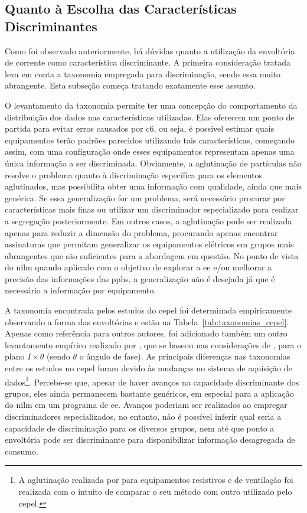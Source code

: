 \subsection{Quanto à Escolha das Características Discriminantes}
\label{ssec:caracteristicas}

Como foi observado anteriormente, há dúvidas quanto a utilização da
envoltória de corrente como característica discriminante. A primeira
consideração tratada leva em conta a taxonomia empregada para
discriminação, sendo essa muito abrangente. Esta subseção começa
tratando exatamente esse assunto.

O levantamento da taxonomia permite ter uma concepção do comportamento
da distribuição dos dados nas características utilizadas. Elas
oferecem um ponto de partida para evitar erros causados por \gls{c6},
ou seja, é possível estimar quais equipamentos terão padrões parecidos
utilizando tais características, começando assim, com uma configuração
onde esses equipamentos representam apenas uma única informação a ser
discriminada. Obviamente, a aglutinação de partículas não resolve o
problema quanto à discriminação específica para os elementos
aglutinados, mas possibilita obter uma informação com qualidade, ainda
que mais genérica. Se essa generalização for um problema, será
necessário procurar por características mais finas ou utilizar um
discriminador especializado para realizar a segregação posteriormente.
Em outros casos, a aglutinação pode ser realizada apenas para reduzir
a dimensão do problema, procurando apenas encontrar assinaturas que
permitam generalizar os equipamentos elétricos em grupos mais
abrangentes que são suficientes para a abordagem em questão. No ponto
de vista do \gls{nilm} quando aplicado com o objetivo de explorar a
\gls{ee} e/ou melhorar a precisão das informações das \glspl{pph}, a
generalização não é desejada já que é necessário a informação por
equipamento.

A taxonomia encontrada pelos estudos do \gls{cepel}
foi determinada empiricamente observando a forma das envoltórias e
estão na Tabela~\ref{tab:taxonomias_cepel}. Apenas como referência
para outros autores, foi adicionado também um outro levantamento
empírico realizado por \citet*{nilm_cepel_aguiar}, que se baseou nas
considerações de \cite{nilm_sultanem_1991_10}, para o plano
$I\times\theta$ (sendo $\theta$ o ângulo de fase). As principais
diferenças nas taxonomias entre os estudos no \gls{cepel} foram devido
às mudanças no sistema de aquisição de dados\footnote{A aglutinação
realizada por \citeauthor{nilm_cepel_bezerra} para equipamentos
resistivos e de ventilação foi realizada com o intuito de comparar o
seu método com outro utilizado pelo \gls{cepel}.}. Percebe-se que,
apesar de haver avanços na capacidade discriminante dos grupos, eles
ainda permanecem bastante genéricos, em especial para a aplicação do
\gls{nilm} em um programa de \gls{ee}. Avanços poderiam ser realizados
ao empregar discriminadores especializados, no entanto, não é possível
inferir qual seria a capacidade de discriminação para os diversos
grupos, nem até que ponto a envoltória pode ser discriminante para
disponibilizar informação desagregada de consumo.

